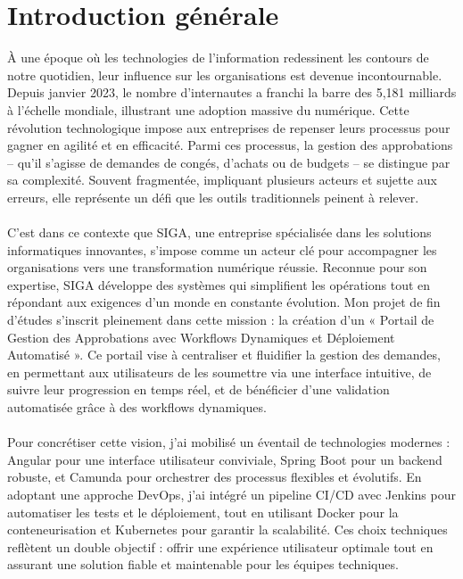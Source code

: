 \chapter*{Introduction générale}

À une époque où les technologies de l’information redessinent les contours de notre quotidien, leur influence sur les organisations est devenue incontournable. Depuis janvier 2023, le nombre d’internautes a franchi la barre des 5,181 milliards à l’échelle mondiale, illustrant une adoption massive du numérique. Cette révolution technologique impose aux entreprises de repenser leurs processus pour gagner en agilité et en efficacité. Parmi ces processus, la gestion des approbations – qu’il s’agisse de demandes de congés, d’achats ou de budgets – se distingue par sa complexité. Souvent fragmentée, impliquant plusieurs acteurs et sujette aux erreurs, elle représente un défi que les outils traditionnels peinent à relever.\\\\

C’est dans ce contexte que SIGA, une entreprise spécialisée dans les solutions informatiques innovantes, s’impose comme un acteur clé pour accompagner les organisations vers une transformation numérique réussie. Reconnue pour son expertise, SIGA développe des systèmes qui simplifient les opérations tout en répondant aux exigences d’un monde en constante évolution. Mon projet de fin d’études s’inscrit pleinement dans cette mission : la création d’un « Portail de Gestion des Approbations avec Workflows Dynamiques et Déploiement Automatisé ». Ce portail vise à centraliser et fluidifier la gestion des demandes, en permettant aux utilisateurs de les soumettre via une interface intuitive, de suivre leur progression en temps réel, et de bénéficier d’une validation automatisée grâce à des workflows dynamiques.\\\\

Pour concrétiser cette vision, j’ai mobilisé un éventail de technologies modernes : Angular pour une interface utilisateur conviviale, Spring Boot pour un backend robuste, et Camunda pour orchestrer des processus flexibles et évolutifs. En adoptant une approche DevOps, j’ai intégré un pipeline CI/CD avec Jenkins pour automatiser les tests et le déploiement, tout en utilisant Docker pour la conteneurisation et Kubernetes pour garantir la scalabilité. Ces choix techniques reflètent un double objectif : offrir une expérience utilisateur optimale tout en assurant une solution fiable et maintenable pour les équipes techniques.\\\\


